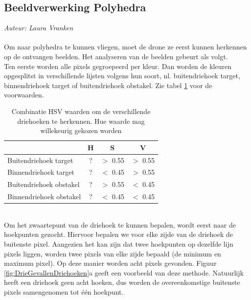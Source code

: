 \subsection{Beeldverwerking Polyhedra}
{\em Auteur: Laura Vranken}
\\
\\
\noindent
Om naar polyhedra te kunnen vliegen, moet de drone ze eerst kunnen herkennen op de ontvangen beelden. Het analyseren van de beelden gebeurt als volgt. 
\\
Ten eerste worden alle pixels gegroepeerd per kleur. Dan worden de kleuren opgesplitst in verschillende lijsten volgens hun soort, nl. buitendriehoek target, binnendriehoek target of buitendriehoek obstakel. Zie tabel \ref{table: HSVwaarden} voor de voorwaarden.
\begin{table}[h]
	\centering
\begin{tabular}{ l | c | c | c }
	 & H & S & V\\\hline
	Buitendriehoek target & ? & \(>\) 0.55 & \(>\) 0.55 \\
	Binnendriehoek target & ? & \(<\) 0.45 & \(>\) 0.55 \\
	Buitendriehoek obstakel & ? & \(>\) 0.55 & \(<\) 0.45 \\
	Binnendriehoek obstakel & ? & \(<\) 0.45 & \(<\) 0.45\\
\end{tabular}
\caption{\label{table: HSVwaarden}Combinatie HSV waarden om de verschillende driehoeken te herkennen. Hue waarde mag willekeurig gekozen worden}
\end{table}
\\
Om het zwaartepunt van de driehoek te kunnen bepalen, wordt eerst naar de hoekpunten gezocht. Hiervoor bepalen we voor elke zijde van de driehoek de buitenste pixel. Aangezien het kan zijn dat twee hoekpunten op dezelfde lijn pixels liggen, worden twee pixels van elke zijde bepaald (de minimum en maximum pixel). Op deze manier worden acht pixels gevonden. Figuur \ref{fig:DrieGevallenDriehoeken}a geeft een voorbeeld van deze methode. Natuurlijk heeft een driehoek geen acht hoeken, dus worden de overeenkomstige buitenste pixels samengenomen tot één hoekpunt. 

